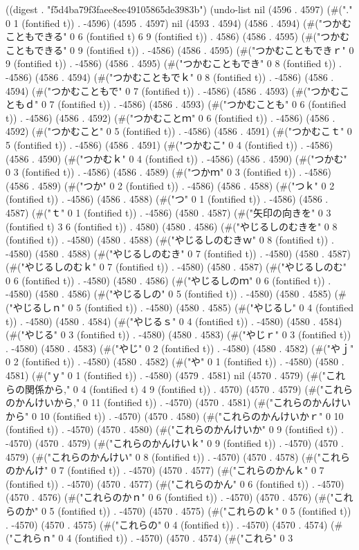 
((digest . "f5d4ba79f3faee8ee49105865de3983b") (undo-list nil (4596 . 4597) (#("." 0 1 (fontified t)) . -4596) (4595 . 4597) nil (4593 . 4594) (4586 . 4594) (#("つかむこともできる" 0 6 (fontified t) 6 9 (fontified t)) . 4586) (4586 . 4595) (#("つかむこともできる" 0 9 (fontified t)) . -4586) (4586 . 4595) (#("つかむこともできｒ" 0 9 (fontified t)) . -4586) (4586 . 4595) (#("つかむこともでき" 0 8 (fontified t)) . -4586) (4586 . 4594) (#("つかむこともでｋ" 0 8 (fontified t)) . -4586) (4586 . 4594) (#("つかむこともで" 0 7 (fontified t)) . -4586) (4586 . 4593) (#("つかむこともｄ" 0 7 (fontified t)) . -4586) (4586 . 4593) (#("つかむことも" 0 6 (fontified t)) . -4586) (4586 . 4592) (#("つかむことｍ" 0 6 (fontified t)) . -4586) (4586 . 4592) (#("つかむこと" 0 5 (fontified t)) . -4586) (4586 . 4591) (#("つかむこｔ" 0 5 (fontified t)) . -4586) (4586 . 4591) (#("つかむこ" 0 4 (fontified t)) . -4586) (4586 . 4590) (#("つかむｋ" 0 4 (fontified t)) . -4586) (4586 . 4590) (#("つかむ" 0 3 (fontified t)) . -4586) (4586 . 4589) (#("つかｍ" 0 3 (fontified t)) . -4586) (4586 . 4589) (#("つか" 0 2 (fontified t)) . -4586) (4586 . 4588) (#("つｋ" 0 2 (fontified t)) . -4586) (4586 . 4588) (#("つ" 0 1 (fontified t)) . -4586) (4586 . 4587) (#("ｔ" 0 1 (fontified t)) . -4586) (4580 . 4587) (#("矢印の向きを" 0 3 (fontified t) 3 6 (fontified t)) . 4580) (4580 . 4586) (#("やじるしのむきを" 0 8 (fontified t)) . -4580) (4580 . 4588) (#("やじるしのむきｗ" 0 8 (fontified t)) . -4580) (4580 . 4588) (#("やじるしのむき" 0 7 (fontified t)) . -4580) (4580 . 4587) (#("やじるしのむｋ" 0 7 (fontified t)) . -4580) (4580 . 4587) (#("やじるしのむ" 0 6 (fontified t)) . -4580) (4580 . 4586) (#("やじるしのｍ" 0 6 (fontified t)) . -4580) (4580 . 4586) (#("やじるしの" 0 5 (fontified t)) . -4580) (4580 . 4585) (#("やじるしｎ" 0 5 (fontified t)) . -4580) (4580 . 4585) (#("やじるし" 0 4 (fontified t)) . -4580) (4580 . 4584) (#("やじるｓ" 0 4 (fontified t)) . -4580) (4580 . 4584) (#("やじる" 0 3 (fontified t)) . -4580) (4580 . 4583) (#("やじｒ" 0 3 (fontified t)) . -4580) (4580 . 4583) (#("やじ" 0 2 (fontified t)) . -4580) (4580 . 4582) (#("やｊ" 0 2 (fontified t)) . -4580) (4580 . 4582) (#("や" 0 1 (fontified t)) . -4580) (4580 . 4581) (#("ｙ" 0 1 (fontified t)) . -4580) (4579 . 4581) nil (4570 . 4579) (#("これらの関係から," 0 4 (fontified t) 4 9 (fontified t)) . 4570) (4570 . 4579) (#("これらのかんけいから," 0 11 (fontified t)) . -4570) (4570 . 4581) (#("これらのかんけいから" 0 10 (fontified t)) . -4570) (4570 . 4580) (#("これらのかんけいかｒ" 0 10 (fontified t)) . -4570) (4570 . 4580) (#("これらのかんけいか" 0 9 (fontified t)) . -4570) (4570 . 4579) (#("これらのかんけいｋ" 0 9 (fontified t)) . -4570) (4570 . 4579) (#("これらのかんけい" 0 8 (fontified t)) . -4570) (4570 . 4578) (#("これらのかんけ" 0 7 (fontified t)) . -4570) (4570 . 4577) (#("これらのかんｋ" 0 7 (fontified t)) . -4570) (4570 . 4577) (#("これらのかん" 0 6 (fontified t)) . -4570) (4570 . 4576) (#("これらのかｎ" 0 6 (fontified t)) . -4570) (4570 . 4576) (#("これらのか" 0 5 (fontified t)) . -4570) (4570 . 4575) (#("これらのｋ" 0 5 (fontified t)) . -4570) (4570 . 4575) (#("これらの" 0 4 (fontified t)) . -4570) (4570 . 4574) (#("これらｎ" 0 4 (fontified t)) . -4570) (4570 . 4574) (#("これら" 0 3 